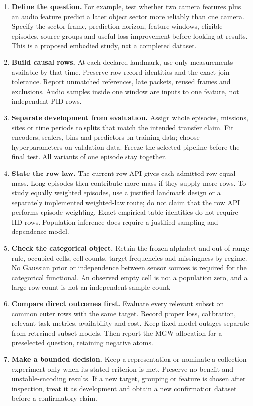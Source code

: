 \documentclass[11pt,a4paper]{article}
\providecommand{\tightlist}{\setlength{\itemsep}{0pt}\setlength{\parskip}{0pt}}
\begin{document}
\begin{enumerate}
\def\labelenumi{\arabic{enumi}.}
\tightlist
\item
  \textbf{Define the question.} For example, test whether two camera features plus an audio feature predict a later object sector more reliably than one camera. Specify the sector frame, prediction horizon, feature windows, eligible episodes, source groups and useful loss improvement before looking at results. This is a proposed embodied study, not a completed dataset.
\item
  \textbf{Build causal rows.} At each declared landmark, use only measurements available by that time. Preserve raw record identities and the exact join tolerance. Report unmatched references, late packets, reused frames and exclusions. Audio samples inside one window are inputs to one feature, not independent PID rows.
\item
  \textbf{Separate development from evaluation.} Assign whole episodes, missions, sites or time periods to splits that match the intended transfer claim. Fit encoders, scalers, bins and predictors on training data; choose hyperparameters on validation data. Freeze the selected pipeline before the final test. All variants of one episode stay together.
\item
  \textbf{State the row law.} The current row API gives each admitted row equal mass. Long episodes then contribute more mass if they supply more rows. To study equally weighted episodes, use a justified landmark design or a separately implemented weighted-law route; do not claim that the row API performs episode weighting. Exact empirical-table identities do not require IID rows. Population inference does require a justified sampling and dependence model.
\item
  \textbf{Check the categorical object.} Retain the frozen alphabet and out-of-range rule, occupied cells, cell counts, target frequencies and missingness by regime. No Gaussian prior or independence between sensor sources is required for the categorical functional. An observed empty cell is not a population zero, and a large row count is not an independent-sample count.
\item
  \textbf{Compare direct outcomes first.} Evaluate every relevant subset on common outer rows with the same target. Record proper loss, calibration, relevant task metrics, availability and cost. Keep fixed-model outages separate from retrained subset models. Then report the MGW allocation for a preselected question, retaining negative atoms.
\item
  \textbf{Make a bounded decision.} Keep a representation or nominate a collection experiment only when its stated criterion is met. Preserve no-benefit and unstable-encoding results. If a new target, grouping or feature is chosen after inspection, treat it as development and obtain a new confirmation dataset before a confirmatory claim.
\end{enumerate}
\end{document}
